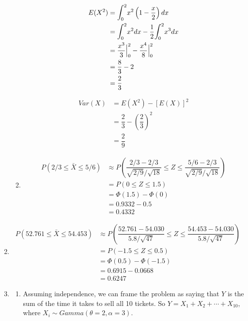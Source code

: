 \documentclass{article}
\newcommand\mfrac[2]{\left(\dfrac{#1}{#2}\right)}
\newcommand\lint{\mathlarger{\int}}
\newcommand\myskip[1]{\addtocounter{enumi}{#1}}
\begin{document}
\begin{enumerate}
\begin{enumerate}
	\begin{align*}
	 E(X^2) &= \lint_0^2{x^2 \left(1 - \dfrac{x}{2}\right)dx} \\
	  &= \lint_0^2{x^2 dx} - \dfrac{1}{2}\lint_0^2 {x^3 dx} \\
	  &= \dfrac{x^3}{3}\Big|_0^2 - \dfrac{x^4}{8}\Big|_0^2 \\
	  &= \dfrac{8}{3} - 2 \\
	  &= \dfrac{2}{3}
	\end{align*}
	
	\begin{align*}
	 Var(X) &= E(X^2) - [E(X)]^2 \\
	  &= \dfrac{2}{3} - \mfrac{2}{3}^2 \\
	  &= \dfrac{2}{9}
	\end{align*}
       
       \item
	\begin{align*}
	 P(2/3 \le \bar{X} \le 5/6) &\approx P\left(\dfrac{2/3 - 2/3}{\sqrt{2/9}/\sqrt{18}} \le Z
	      \le \dfrac{5/6 - 2/3}{\sqrt{2/9}/\sqrt{18}}\right) \\
	  &= P(0 \le Z \le 1.5) \\
	  &= \Phi(1.5) - \Phi(0) \\
	  &= 0.9332 - 0.5 \\
	  &= 0.4332
	\end{align*}
      \end{enumerate}
     
     \item
      \begin{align*}
       P(52.761 \le \bar{X} \le 54.453) &\approx P\left(\dfrac{52.761 - 54.030}{5.8/\sqrt{47}} \le Z
	      \le \dfrac{54.453 - 54.030}{5.8/\sqrt{47}}\right) \\
	  &= P(-1.5 \le Z \le 0.5) \\
	  &= \Phi(0.5) - \Phi(-1.5) \\ 
	  &= 0.6915 - 0.0668 \\
	  &= 0.6247
      \end{align*}
     \myskip{4}
     
     \item
      \begin{enumerate}
       \item 
	Assuming independence, we can frame the problem as saying that $Y$ is the sum of the time it 
	takes to sell all 10 tickets. So $Y = X_1 + X_2 + \cdots + X_10$, 
	where $X_i \sim Gamma(\theta=2, \alpha=3)$.
	

\end{enumerate}
\end{enumerate}
\end{document}
